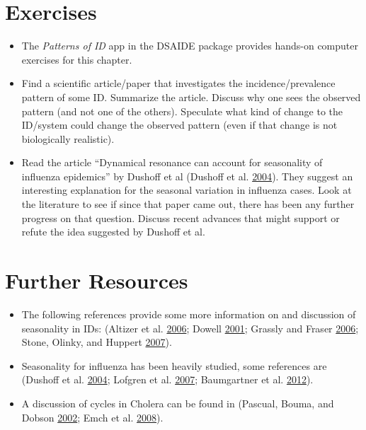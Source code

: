 \documentclass[]{book}
\providecommand{\tightlist}{%
  \setlength{\itemsep}{0pt}\setlength{\parskip}{0pt}}
\theoremstyle{definition}
\theoremstyle{definition}
\theoremstyle{definition}
\theoremstyle{remark}
\begin{document}
\section{Exercises}\label{exercises-2}

\begin{itemize}
\tightlist
\item
  The \emph{Patterns of ID} app in the DSAIDE package provides hands-on
  computer exercises for this chapter.
\item
  Find a scientific article/paper that investigates the
  incidence/prevalence pattern of some ID. Summarize the article.
  Discuss why one sees the observed pattern (and not one of the others).
  Speculate what kind of change to the ID/system could change the
  observed pattern (even if that change is not biologically realistic).
\item
  Read the article ``Dynamical resonance can account for seasonality of
  influenza epidemics'' by Dushoff et al (Dushoff et al.
  \protect\hyperlink{ref-dushoff04}{2004}). They suggest an interesting
  explanation for the seasonal variation in influenza cases. Look at the
  literature to see if since that paper came out, there has been any
  further progress on that question. Discuss recent advances that might
  support or refute the idea suggested by Dushoff et al.
\end{itemize}

\section{Further Resources}\label{further-resources-2}

\begin{itemize}
\tightlist
\item
  The following references provide some more information on and
  discussion of seasonality in IDs: (Altizer et al.
  \protect\hyperlink{ref-altizer06}{2006}; Dowell
  \protect\hyperlink{ref-dowell01}{2001}; Grassly and Fraser
  \protect\hyperlink{ref-grassly06}{2006}; Stone, Olinky, and Huppert
  \protect\hyperlink{ref-stone07}{2007}).
\item
  Seasonality for influenza has been heavily studied, some references
  are (Dushoff et al. \protect\hyperlink{ref-dushoff04}{2004}; Lofgren
  et al. \protect\hyperlink{ref-lofgren07}{2007}; Baumgartner et al.
  \protect\hyperlink{ref-baumgartner12}{2012}).
\item
  A discussion of cycles in Cholera can be found in (Pascual, Bouma, and
  Dobson \protect\hyperlink{ref-pascual02}{2002}; Emch et al.
  \protect\hyperlink{ref-emch08}{2008}).
\end{itemize}
\end{document}
